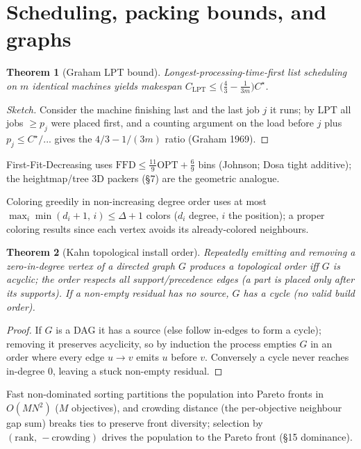 \documentclass[11pt]{article}
\theoremstyle{definition}\newtheorem{definition}{Definition}[section]
\theoremstyle{plain}\newtheorem{theorem}{Theorem}[section]
\begin{document}
\section{Scheduling, packing bounds, and graphs}
\begin{theorem}[Graham LPT bound]\label{thm:lpt}
Longest-processing-time-first list scheduling on $m$ identical machines yields makespan
$C_{\mathrm{LPT}}\le\big(\tfrac43-\tfrac{1}{3m}\big)C^\star$.
\end{theorem}
\begin{proof}[Sketch]
Consider the machine finishing last and the last job $j$ it runs; by LPT all jobs $\ge p_j$ were placed
first, and a counting argument on the load before $j$ plus $p_j\le C^\star/... $ gives the $4/3-1/(3m)$ ratio
(Graham 1969).
\end{proof}
\begin{proposition}
First-Fit-Decreasing uses $\mathrm{FFD}\le\tfrac{11}{9}\mathrm{OPT}+\tfrac69$ bins (Johnson; Dosa tight
additive); the heightmap/tree 3D packers (\S7) are the geometric analogue.
\end{proposition}
\begin{proposition}
Coloring greedily in non-increasing degree order uses at most $\max_i\min(d_i+1,\,i)\le\Delta+1$ colors
($d_i$ degree, $i$ the position); a proper coloring results since each vertex avoids its already-colored
neighbours.
\end{proposition}
\begin{theorem}[Kahn topological install order]\label{thm:kahn}
Repeatedly emitting and removing a zero-in-degree vertex of a directed graph $G$ produces a topological order
iff $G$ is acyclic; the order respects all support/precedence edges (a part is placed only after its
supports). If a non-empty residual has no source, $G$ has a cycle (no valid build order).
\end{theorem}
\begin{proof}
If $G$ is a DAG it has a source (else follow in-edges to form a cycle); removing it preserves acyclicity, so
by induction the process empties $G$ in an order where every edge $u\to v$ emits $u$ before $v$. Conversely a
cycle never reaches in-degree $0$, leaving a stuck non-empty residual.
\end{proof}
\begin{proposition}[NSGA-II]
Fast non-dominated sorting partitions the population into Pareto fronts in $O(MN^2)$ ($M$ objectives), and
crowding distance (the per-objective neighbour gap sum) breaks ties to preserve front diversity; selection by
$(\text{rank},\,-\text{crowding})$ drives the population to the Pareto front (\S15 dominance).
\end{proposition}
\end{document}

